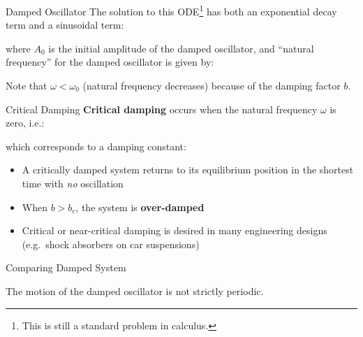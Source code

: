 \documentclass[12pt,compress,aspectratio=169]{beamer}
\begin{document}
\begin{frame}{Damped Oscillator}
  The solution to this ODE\footnote{This is still a standard problem in
    calculus.} has both an {\color{red}exponential decay term} and a
  {\color{blue}sinusoidal term}:


  \vspace{-.15in}where $A_0$ is the initial amplitude of the damped oscillator,
  and ``natural frequency'' for the damped oscillator is given by:

  
  Note that $\omega<\omega_0$ (natural frequency decreases) because of the
  damping factor $b$.
  \vspace{.2in}
\end{frame}



\begin{frame}{Critical Damping}
  \textbf{Critical damping} occurs when the natural frequency $\omega$ is zero,
  i.e.:
  

  which corresponds to a damping constant:

  \begin{itemize}
  \item\vspace{-.1in}A critically damped system returns to its equilibrium
    position in the shortest time with \emph{no} oscillation
  \item When $b>b_c$, the system is \textbf{over-damped}
  \item Critical or near-critical damping is desired in many engineering designs
    (e.g.\ shock absorbers on car suspensions)
  \end{itemize}
\end{frame}



\begin{frame}{Comparing Damped System}
  \centering
  
  The motion of the damped oscillator is not strictly periodic.
\end{frame}



%
%
%
%
%
\end{document}

